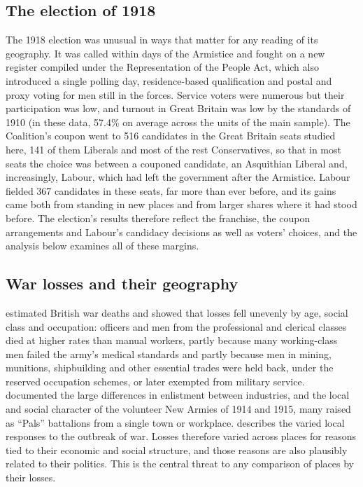 \documentclass[11pt,a4paper]{article}
\begin{document}
\subsection{The election of 1918}
The 1918 election was unusual in ways that matter for any reading of its geography. It was called within days of the Armistice and fought on a new register compiled under the Representation of the People Act, which also introduced a single polling day, residence-based qualification and postal and proxy voting for men still in the forces. Service voters were numerous but their participation was low, and turnout in Great Britain was low by the standards of 1910 (in these data, 57.4\% on average across the units of the main sample). The Coalition's coupon went to 516 candidates in the Great Britain seats studied here, 141 of them Liberals and most of the rest Conservatives, so that in most seats the choice was between a couponed candidate, an Asquithian Liberal and, increasingly, Labour, which had left the government after the Armistice. Labour fielded 367 candidates in these seats, far more than ever before, and its gains came both from standing in new places and from larger shares where it had stood before. The election's results therefore reflect the franchise, the coupon arrangements and Labour's candidacy decisions as well as voters' choices, and the analysis below examines all of these margins.

\subsection{War losses and their geography}
\citet{winter1977,winter1985} estimated British war deaths and showed that losses fell unevenly by age, social class and occupation: officers and men from the professional and clerical classes died at higher rates than manual workers, partly because many working-class men failed the army's medical standards and partly because men in mining, munitions, shipbuilding and other essential trades were held back, under the reserved occupation schemes, or later exempted from military service. \citet{dewey1984} documented the large differences in enlistment between industries, and \citet{simkins1988} the local and social character of the volunteer New Armies of 1914 and 1915, many raised as ``Pals'' battalions from a single town or workplace. \citet{pennell2012} describes the varied local responses to the outbreak of war. Losses therefore varied across places for reasons tied to their economic and social structure, and those reasons are also plausibly related to their politics. This is the central threat to any comparison of places by their losses.
\end{document}
